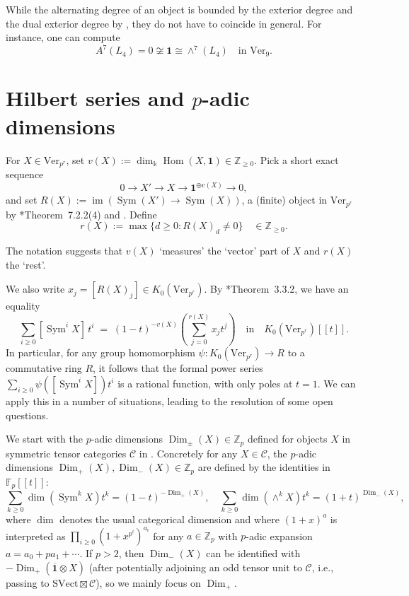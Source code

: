 \documentclass[11pt,oneside]{amsart}
\theoremstyle{definition}
\theoremstyle{remark}
\numberwithin{equation}{section}
\newcommand\cC{\mathcal C}
\newcommand\Ver{\mathrm{Ver}}
\newcommand\SVect{\mathrm{SVect}}
\newcommand\Dim{\operatorname{Dim}}
\newcommand\im{\operatorname{im}}
\newcommand\Sym{\operatorname{Sym}}
\renewcommand\:\colon
\newcommand\ol{\overline}
\newcommand\one{\mathbf{1}}
\newcommand\kk{\Bbbk}
\newcommand\Hom{\operatorname{Hom}}
\newcommand\ZZ{\mathbb Z}
\begin{document}
\begin{remark} While the alternating degree of an object is bounded by the exterior degree and the dual exterior degree by , they do not have to coincide in general. For instance, one can compute
$$
A^7(L_4)=0\not\cong \one\cong \wedge^7(L_4) 
\quad \text{in } \Ver_9.
$$    
\end{remark}


\section{Hilbert series and \texorpdfstring{$p$}{p}-adic dimensions} \label{sec:dim}


\begin{definition} For $X\in\Ver_{p^r}$, set $v(X):=\dim_\kk\Hom(X,\one)\in\ZZ_{\ge0}$. Pick a short exact sequence
$$
0\to X' \to X \to \one^{\oplus v(X)} \to 0 ,
$$
and set $R(X):=\im(\Sym(X')\to\Sym(X))$, a (finite) object in $\Ver_{p^r}$ by \cite{CEO-incompressible}*{Theorem~7.2.2(4)} and . Define 
$$
r(X):=\max\{d\ge0: R(X)_d\neq0\}  \quad \in\ZZ_{\ge0}.
$$
\end{definition}

The notation suggests that $v(X)$ `measures' the `vector' part of $X$ and $r(X)$ the `rest'.



 We also write $x_j=[R(X)_j]\in K_0(\Ver_{p^r})$. By \cite{CEO-incompressible}*{Theorem~3.3.2}, we have an equality
\begin{equation}
    \label{eq:origin}
    \sum_{i\ge 0} [\Sym^i X]\, t^i\;=\; (1-t)^{-v(X)}\left(\sum_{j=0}^{r(X)}x_jt^j\right)\quad\mbox{in}\quad K_0(\Ver_{p^r})[[t]].
\end{equation}
In particular, for any group homomorphism $\psi:K_0(\Ver_{p^r})\to R$ to a commutative ring $R$, it follows that the formal power series $\sum_{i\ge 0} \psi([\Sym^i X]) t^i$ is a rational function, with only poles at $t=1$. We can apply this in a number of situations, leading to the resolution of some open questions.

We start with the $p$-adic dimensions $\Dim_{\pm}(X)\in\mathbb{Z}_p$ defined for objects $X$ in symmetric tensor categories $\cC$ in \cite{EHO}. Concretely for any $X\in\cC$, the $p$-adic dimensions $\Dim_+(X),\Dim_-(X)\in\ZZ_p$ are defined by the identities in $\mathbb{F}_p[[t]]$:
$$
\sum_{k\ge0} \dim(\Sym^k X) t^k = (1-t)^{-\Dim_+(X)} ,\quad
\sum_{k\ge0} \dim(\wedge^k X) t^k = (1+t)^{\Dim_-(X)} ,\quad
$$
where $\dim$ denotes the usual categorical dimension and where $(1+x)^a$ is interpreted as $\prod_{i\ge 0} (1+x^{p^i})^{a_i}$ for any $a\in\ZZ_p$ with $p$-adic expansion $a=a_0+p a_1+\cdots$. If $p>2$, then $\Dim_-(X)$ can be identified with $-\Dim_+(\ol{\one}\otimes X)$ (after potentially adjoining an odd tensor unit to $\cC$, i.e., passing to $\SVect\boxtimes\cC$), so we mainly focus on $\Dim_+$.
\end{document}
